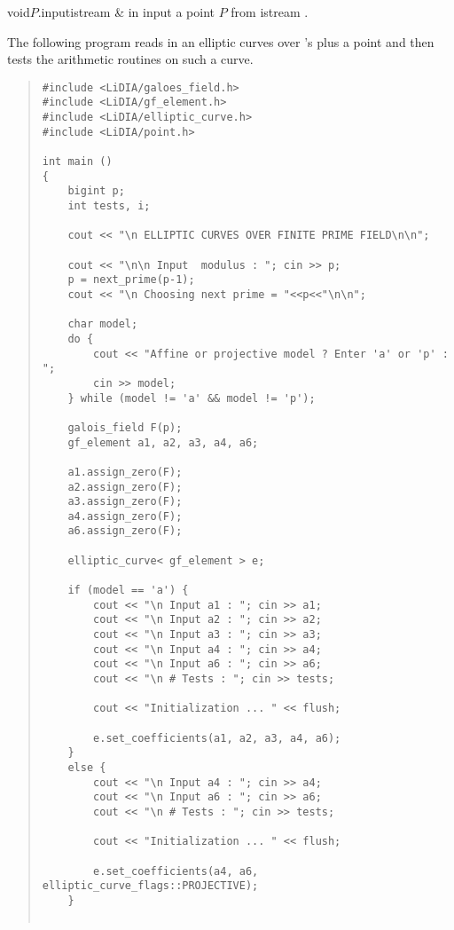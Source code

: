 \begin{fcode}{void}{$P$.input}{istream & in}
  input a point $P$ from istream .
\end{fcode}



\EXAMPLES

The following program reads in an elliptic curves over 's plus a point and then
tests the arithmetic routines on such a curve.

\begin{quote}
\begin{verbatim}
#include <LiDIA/galoes_field.h>
#include <LiDIA/gf_element.h>
#include <LiDIA/elliptic_curve.h>
#include <LiDIA/point.h>

int main ()
{
    bigint p;
    int tests, i;

    cout << "\n ELLIPTIC CURVES OVER FINITE PRIME FIELD\n\n";

    cout << "\n\n Input  modulus : "; cin >> p;
    p = next_prime(p-1);
    cout << "\n Choosing next prime = "<<p<<"\n\n";

    char model;
    do {
        cout << "Affine or projective model ? Enter 'a' or 'p' : ";
        cin >> model;
    } while (model != 'a' && model != 'p');

    galois_field F(p);
    gf_element a1, a2, a3, a4, a6;

    a1.assign_zero(F);
    a2.assign_zero(F);
    a3.assign_zero(F);
    a4.assign_zero(F);
    a6.assign_zero(F);

    elliptic_curve< gf_element > e;

    if (model == 'a') {
        cout << "\n Input a1 : "; cin >> a1;
        cout << "\n Input a2 : "; cin >> a2;
        cout << "\n Input a3 : "; cin >> a3;
        cout << "\n Input a4 : "; cin >> a4;
        cout << "\n Input a6 : "; cin >> a6;
        cout << "\n # Tests : "; cin >> tests;

        cout << "Initialization ... " << flush;

        e.set_coefficients(a1, a2, a3, a4, a6);
    }
    else {
        cout << "\n Input a4 : "; cin >> a4;
        cout << "\n Input a6 : "; cin >> a6;
        cout << "\n # Tests : "; cin >> tests;

        cout << "Initialization ... " << flush;

        e.set_coefficients(a4, a6, elliptic_curve_flags::PROJECTIVE);
    }


\end{verbatim}
\end{quote}
